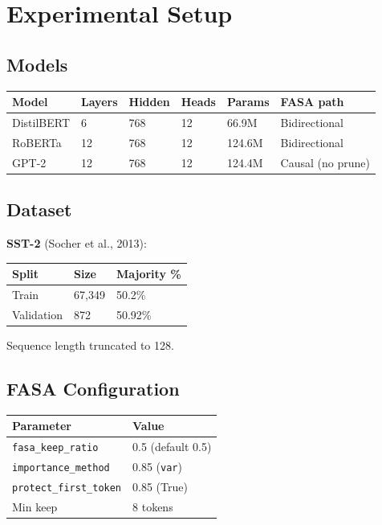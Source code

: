 
\section{Experimental Setup}

\subsection{Models}

\begin{table}[H]
\centering
\small
\begin{tabular}{llllll}
\toprule
\textbf{Model} & \textbf{Layers} & \textbf{Hidden} & \textbf{Heads} & \textbf{Params} & \textbf{FASA path} \\
\midrule
DistilBERT & 6 & 768 & 12 & 66.9M & Bidirectional \\
RoBERTa & 12 & 768 & 12 & 124.6M & Bidirectional \\
GPT-2 & 12 & 768 & 12 & 124.4M & Causal (no prune) \\
\bottomrule
\end{tabular}
\end{table}

\subsection{Dataset}

\textbf{SST-2} (Socher et al., 2013):

\begin{table}[H]
\centering
\small
\begin{tabular}{lll}
\toprule
\textbf{Split} & \textbf{Size} & \textbf{Majority \%} \\
\midrule
Train & 67,349 & 50.2\% \\
Validation & 872 & 50.92\% \\
\bottomrule
\end{tabular}
\end{table}

Sequence length truncated to 128.

\subsection{FASA Configuration}

\begin{table}[H]
\centering
\small
\begin{tabular}{ll}
\toprule
\textbf{Parameter} & \textbf{Value} \\
\midrule
\texttt{fasa\_keep\_ratio} & 0.5 (default 0.5) \\
\texttt{importance\_method} & 0.85 (\texttt{var}) \\
\texttt{protect\_first\_token} & 0.85 (True) \\
Min keep & 8 tokens \\
\bottomrule
\end{tabular}
\end{table}

